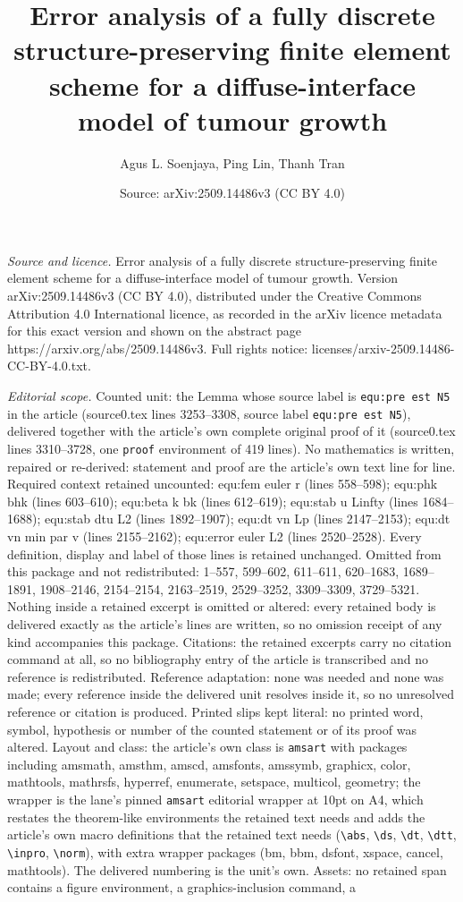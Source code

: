 \documentclass[10pt,a4paper]{amsart}
\title[Error analysis of a fully discrete structure-preserving fini]{Error analysis of a fully discrete structure-preserving finite element scheme for a diffuse-interface model of tumour growth}
\author{Agus L. Soenjaya, Ping Lin, Thanh Tran}
\date{Source: arXiv:2509.14486v3 (CC BY 4.0)}
\begin{document}
\maketitle

\noindent\emph{Source and licence.} Error analysis of a fully discrete structure-preserving finite element scheme for a diffuse-interface model of tumour growth. Version arXiv:2509.14486v3 (CC BY 4.0), distributed under the Creative Commons Attribution 4.0 International licence, as recorded in the arXiv licence metadata for this exact version and shown on the abstract page https://arxiv.org/abs/2509.14486v3. Full rights notice: licenses/arxiv-2509.14486-CC-BY-4.0.txt.\par\smallskip

\noindent\textit{Editorial scope.} Counted unit: the Lemma whose source label is \texttt{equ:pre est N5} in the article (source0.tex lines 3253--3308, source label \texttt{equ:pre est N5}), delivered together with the article's own complete original proof of it (source0.tex lines 3310--3728, one \texttt{proof} environment of 419 lines). No mathematics is written, repaired or re-derived: statement and proof are the article's own text line for line. Required context retained uncounted: equ:fem euler r (lines 558--598); equ:phk bhk (lines 603--610); equ:beta k bk (lines 612--619); equ:stab u Linfty (lines 1684--1688); equ:stab dtu L2 (lines 1892--1907); equ:dt vn Lp (lines 2147--2153); equ:dt vn min par v (lines 2155--2162); equ:error euler L2 (lines 2520--2528). Every definition, display and label of those lines is retained unchanged. Omitted from this package and not redistributed: 1--557, 599--602, 611--611, 620--1683, 1689--1891, 1908--2146, 2154--2154, 2163--2519, 2529--3252, 3309--3309, 3729--5321. Nothing inside a retained excerpt is omitted or altered: every retained body is delivered exactly as the article's lines are written, so no omission receipt of any kind accompanies this package. Citations: the retained excerpts carry no citation command at all, so no bibliography entry of the article is transcribed and no reference is redistributed. Reference adaptation: none was needed and none was made; every reference inside the delivered unit resolves inside it, so no unresolved reference or citation is produced. Printed slips kept literal: no printed word, symbol, hypothesis or number of the counted statement or of its proof was altered. Layout and class: the article's own class is \texttt{amsart} with packages including amsmath, amsthm, amscd, amsfonts, amssymb, graphicx, color, mathtools, mathrsfs, hyperref, enumerate, setspace, multicol, geometry; the wrapper is the lane's pinned \texttt{amsart} editorial wrapper at 10pt on A4, which restates the theorem-like environments the retained text needs and adds the article's own macro definitions that the retained text needs (\texttt{\textbackslash abs}, \texttt{\textbackslash ds}, \texttt{\textbackslash dt}, \texttt{\textbackslash dtt}, \texttt{\textbackslash inpro}, \texttt{\textbackslash norm}), with extra wrapper packages (bm, bbm, dsfont, xspace, cancel, mathtools). The delivered numbering is the unit's own. Assets: no retained span contains a figure environment, a graphics-inclusion command, a 
\end{document}
